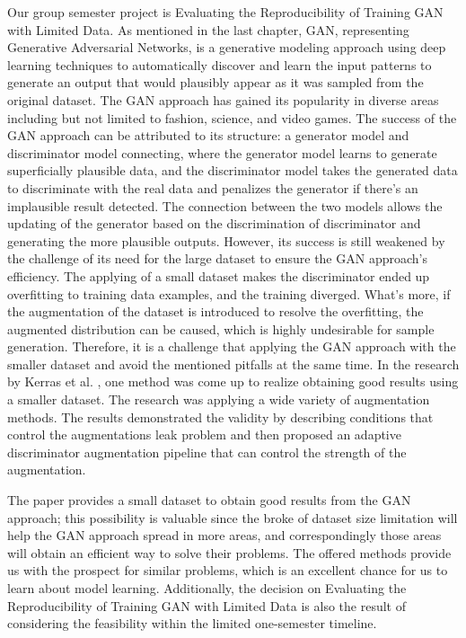 \documentclass{report}
\begin{document}
Our group semester project is Evaluating the Reproducibility of Training GAN with Limited Data.
As mentioned in the last chapter, GAN, representing Generative Adversarial Networks, is a generative modeling approach using deep learning techniques to automatically discover and learn the input patterns to generate an output that would plausibly appear as it was sampled from the original dataset\cite{goodfellow2014generative}. The GAN approach has gained its popularity in diverse areas including but not limited to fashion, science, and video games\cite{gui2020review}. The success of the GAN approach can be attributed to its structure: a generator model and discriminator model connecting, where the generator model learns to generate superficially plausible data, and the discriminator model takes the generated data to discriminate with the real data and penalizes the generator if there’s an implausible result detected\cite{creswell2018generative}. The connection between the two models allows the updating of the generator based on the discrimination of discriminator and generating the more plausible outputs\cite{radford2015unsupervised}. However, its success is still weakened by the challenge of its need for the large dataset to ensure the GAN approach's efficiency. The applying of a small dataset makes the discriminator ended up overfitting to training data examples, and the training diverged\cite{zhao2020improved}.
What’s more, if the augmentation of the dataset is introduced to resolve the overfitting, the augmented distribution can be caused, which is highly undesirable for sample generation.\cite{zhao2020improved} Therefore, it is a challenge that applying the GAN approach with the smaller dataset and avoid the mentioned pitfalls at the same time. In the research by Kerras et al. \cite{karras2020training}, one method was come up to realize obtaining good results using a smaller dataset. The research was applying a wide variety of augmentation methods. The results demonstrated the validity by describing conditions that control the augmentations leak problem and then proposed an adaptive discriminator augmentation pipeline that can control the strength of the augmentation. 

The paper provides a small dataset to obtain good results from the GAN approach; this possibility is valuable since the broke of dataset size limitation will help the GAN approach spread in more areas, and correspondingly those areas will obtain an efficient way to solve their problems. 
The offered methods provide us with the prospect for similar problems, which is an excellent chance for us to learn about model learning. Additionally, the decision on Evaluating the Reproducibility of Training GAN with Limited Data is also the result of considering the feasibility within the limited one-semester timeline.
\end{document}
